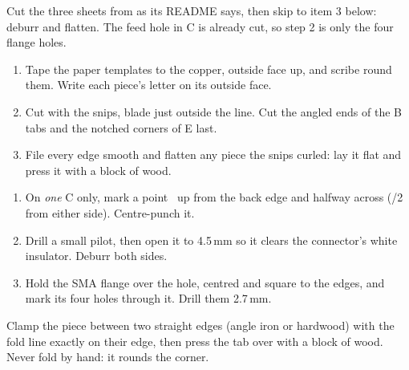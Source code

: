 \documentclass[10pt]{article}
\begin{document}
\begin{note}[On a waterjet]
Cut the three sheets from  as its README says, then skip to item 3 below: deburr and flatten. The feed hole in C is already cut, so step 2 is only the four flange holes.
\end{note}
\begin{enumerate}
  \item Tape the paper templates to the copper, outside face up, and scribe round them. Write each piece's letter on its outside face.
  \item Cut with the snips, blade just outside the line. Cut the angled ends of the B tabs and the notched corners of E last.
  \item File every edge smooth and flatten any piece the snips curled: lay it flat and press it with a block of wood.
\end{enumerate}

\begin{enumerate}
  \item On \emph{one} C only, mark a point \probeZ\ up from the back edge and halfway across (\wideW/2 from either side). Centre-punch it.
  \item Drill a small pilot, then open it to 4.5\,mm so it clears the connector's white insulator. Deburr both sides.
  \item Hold the SMA flange over the hole, centred and square to the edges, and mark its four holes through it. Drill them 2.7\,mm.
\end{enumerate}

Clamp the piece between two straight edges (angle iron or hardwood) with the fold line exactly on their edge, then press the tab over with a block of wood. Never fold by hand: it rounds the corner.
\end{document}
